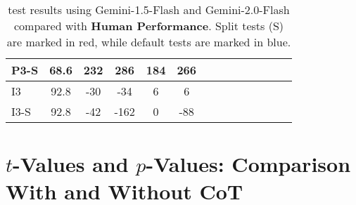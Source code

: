 \begin{table*}[h]
{\begin{tabular}{lccccccccccccc}
    \cellcolor{myred!34.0} P3-S & 68.6 & 232  & 286  & 184  & 266 \\
    \midrule
    \cellcolor{myblue!34.0} I3 & 92.8 & -30  & -34  & 6  & 6 \\
    \cellcolor{myred!34.0} I3-S & 92.8 & -42  & -162  & 0  & -88 \\
    \bottomrule
    \end{tabular}
    }
    \caption{{\methodname} test results using Gemini-1.5-Flash and Gemini-2.0-Flash compared with \textbf{Human Performance}. Split tests (S) are marked in \colorbox{myred!34}{red}, while default tests are marked in \colorbox{myblue!34}{blue}.}
    \label{tab:gemini-flash-human}
\end{table*}

\clearpage

\section{$t$-Values and $p$-Values: Comparison With and Without CoT}

